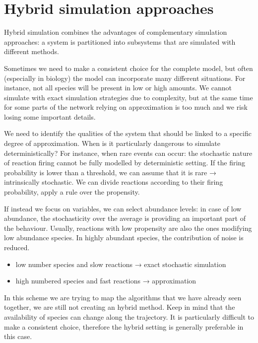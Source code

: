 \graphicspath{{chapters/06/}}
\chapter{Hybrid simulation
approaches}

Hybrid simulation combines the advantages of complementary simulation
approaches: a system is partitioned into subsystems that are simulated
with different methods.

Sometimes we need to make a consistent choice for the complete model,
but often (especially in biology) the model can incorporate many
different situations. For instance, not all species will be present in
low or high amounts. We cannot simulate with exact simulation strategies
due to complexity, but at the same time for some parts of the network
relying on approximation is too much and we risk losing some important
details.

We need to identify the qualities of the system that should be linked to
a specific degree of approximation. When is it particularly dangerous to
simulate deterministically? For instance, when rare events can occur:
the stochastic nature of reaction firing cannot be fully modelled by
deterministic setting. If the firing probability is lower than a
threshold, we can assume that it is rare → intrinsically stochastic. We
can divide reactions according to their firing probability, apply a rule
over the propensity.

If instead we focus on variables, we can select abundance levels: in
case of low abundance, the stochasticity over the average is providing
an important part of the behaviour. Usually, reactions with low
propensity are also the ones modifying low abundance species. In highly
abundant species, the contribution of noise is reduced.

\begin{itemize}
\tightlist
\item
  low number species and slow reactions → exact stochastic simulation
\item
  high numbered species and fast reactions → approximation
\end{itemize}

In this scheme we are trying to map the algorithms that we have already
seen together, we are still not creating an hybrid method. Keep in mind
that the availability of species can change along the trajectory. It is
particularly difficult to make a consistent choice, therefore the hybrid
setting is generally preferable in this case.

